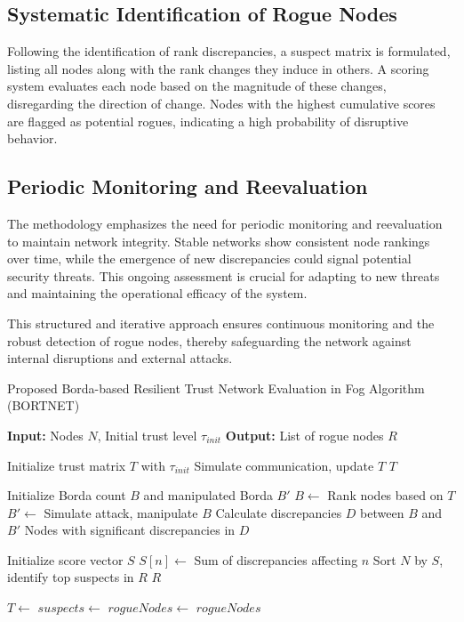 \documentclass{sn-jnl}%
\begin{document}
\subsection{Systematic Identification of Rogue Nodes}

Following the identification of rank discrepancies, a suspect matrix is formulated, listing all nodes along with the rank changes they induce in others. A scoring system evaluates each node based on the magnitude of these changes, disregarding the direction of change. Nodes with the highest cumulative scores are flagged as potential rogues, indicating a high probability of disruptive behavior.

\subsection{Periodic Monitoring and Reevaluation}

The methodology emphasizes the need for periodic monitoring and reevaluation to maintain network integrity. Stable networks show consistent node rankings over time, while the emergence of new discrepancies could signal potential security threats. This ongoing assessment is crucial for adapting to new threats and maintaining the operational efficacy of the system.

This structured and iterative approach ensures continuous monitoring and the robust detection of rogue nodes, thereby safeguarding the network against internal disruptions and external attacks.
\begin{algorithm}
\caption{ Proposed Borda-based Resilient Trust Network Evaluation in Fog Algorithm (BORTNET) }
\begin{algorithmic}[1]
\State \textbf{Input:} Nodes $N$, Initial trust level $\tau_{init}$
\State \textbf{Output:} List of rogue nodes $R$

    \State Initialize trust matrix $T$ with $\tau_{init}$
        \State Simulate communication, update $T$
    \EndFor
    \State \Return $T$
\EndProcedure

    \State Initialize Borda count $B$ and manipulated Borda $B'$
    \State $B \gets$ Rank nodes based on $T$
    \State $B' \gets$ Simulate attack, manipulate $B$
    \State Calculate discrepancies $D$ between $B$ and $B'$
    \State \Return Nodes with significant discrepancies in $D$
\EndProcedure

    \State Initialize score vector $S$
        \State $S[n] \gets$ Sum of discrepancies affecting $n$
    \EndFor
    \State Sort $N$ by $S$, identify top suspects in $R$
    \State \Return $R$
\EndProcedure

    \State $T \gets$ 
    \State $suspects \gets$ 
    \State $rogueNodes \gets$ 
    \State \Return $rogueNodes$
\EndProcedure

\end{algorithmic}
\end{algorithm}
\end{document}
